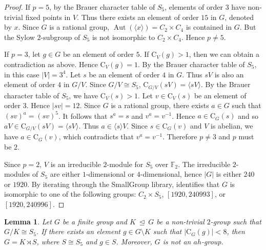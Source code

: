 \documentclass[11pt]{article}
\providecommand{\bbF}{{\mathbb F}} %
\providecommand{\C}{{\mathrm{C}}}
\providecommand{\teq}{{\ \trianglelefteq \ }}
\providecommand{\Aut}{{\operatorname{Aut}}}
\providecommand{\gen}[1]{\langle #1 \rangle} %
\providecommand{\gen}[1]{\langle #1 \rangle} %
\providecommand{\gen}[1]{\langle #1 \rangle} %
\providecommand{\bbF}{\mathbb{F}}
\newtheorem{lem}{Lemma}
\begin{document}
\begin{proof}
    If $p=5$, by the Brauer character table of $S_5$,
    elements of order $3$ have non-trivial fixed points in $V$.
    Thus there exists an element of order $15$ in $G$, denoted by $x$.
    Since $G$ is a rational group,
    $\Aut(\gen{x})=C_2\times C_4$ is contained in $G$.
    But the Sylow $2$-subgroup of $S_5$ is not isomorphic to $C_2\times C_4$.
    Hence $p\neq 5$.

    If $p=3$, let $g\in G$ be an element of order $5$.
    If $\C_V(g)>1$, then we can obtain a contradiction as above.
    Hence $\C_V(g)=1$.
    By the Brauer character table of $S_5$, in this case $|V|=3^4$.
    Let $s$ be an element of order $4$ in $G$.
    Thus $sV$ is also an element of order $4$ in $G/V$.
    Since $G/V\cong S_5$, $\C_{G/V}(sV) = \gen{sV}$.
    By the Brauer character table of $S_5$,
    we have $\C_V(s)>1$.
    Let $v\in \C_V(s)$ be an element of order $3$.
    Hence $|sv|=12$.
    Since $G$ is a rational group,
    there exists $a\in G$ such that $(sv)^a = (sv)^5$.
    It follows that $s^a = s$ and $v^a = v^{-1}$.
    Hence $a\in \C_G(s)$ and so $aV \in \C_{G/V}(sV) = \gen{sV}$.
    Thus $a\in \gen{s}V$.
    Since $s\in \C_G(v)$ and $V$ is abelian,
    we have $a\in \C_G(v)$, which contradicts that $v^a = v^{-1}$.
    Therefore  $p\neq 3$ and $p$ must be $2$.

    Since $p=2$, $V$ is an irreducible $2$-module for $S_5$ over $\bbF_2$.
    The irreducible $2$-modules of $S_5$ are either $1$-dimensional or $4$-dimensional,
    hence $|G|$ is either $240$ or $1920$.
    By iterating through the SmallGroup library, 
    \cite[Code 2]{Git} identifies that $G$ is isomorphic to one of the following groups:
    $C_2\times S_5$, $[1920,240993]$, or $[1920,240996]$.
\end{proof}


\begin{lem}
\label{2or16}
    Let $G$ be a finite group and $K\teq G$ be a non-trivial $2$-group 
    such that $G/K\cong S_5$. 
    If there exists an element $g \in G\setminus K$ such that $|\C_G(g)|< 8$, 
    then $G=K\rtimes S$, where $S\cong S_5$ and $g\in S$.
    Moreover, $G$ is not an $ah$-group.
\end{lem}
\end{document}
